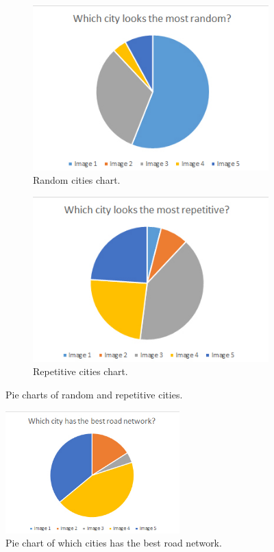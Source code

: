 \begin{figure}[h]
	\begin{subfigure}{0.5\textwidth}
		\centering
		\includegraphics[width=0.9\linewidth]{"Images/Random"}
		\caption{Random cities chart.}
		\label{fig:pie-chart-least-natural}
	\end{subfigure}
	\begin{subfigure}{0.5\textwidth}
		\centering
		\includegraphics[width=0.9\linewidth]{"Images/Repetitive"}
		\caption{Repetitive cities chart.}
		\label{fig:pie-chart-natural}
	\end{subfigure}
	\caption{Pie charts of random and repetitive cities.}
	\label{fig:pie-chart-natural-least-natural}
\end{figure}

	\begin{figure}[h]
		\centering
		\includegraphics[width=0.6\textwidth]{"Images/RoadNetwork"}
		\caption{Pie chart of which cities has the best road network.}
		\label{fig:pie-chart-road-network}
	\end{figure}